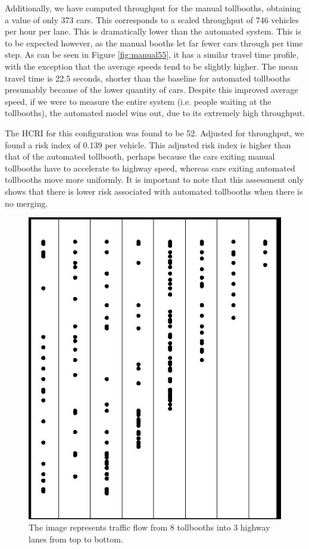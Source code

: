 \documentclass[a4paper, 11pt]{article}
\begin{document}
Additionally, we have computed throughput for the manual tollbooths, obtaining a value of only 373 cars. This corresponds to a scaled throughput of 746 vehicles per hour per lane. This is dramatically lower than the automated system. This is to be expected however, as the manual booths let far fewer cars through per time step. As can be seen in Figure \ref{fig:manual55}, it %
has a similar travel time profile, with the exception that the average speeds tend to be slightly higher. The mean travel time is 22.5 seconds, shorter than the baseline for automated tollbooths presumably because of the lower quantity of cars. Despite this improved average speed, if we were to measure the entire system (i.e. people waiting at the tollbooths), the automated model wins out, due to its extremely high throughput. 

The HCRI for this configuration was found to be 52. Adjusted for throughput, we found a risk index of 0.139 per vehicle. This adjusted risk index is higher than that of the automated tollbooth, perhaps because the cars exiting manual tollbooths have to accelerate to highway speed, whereas cars exiting automated tollbooths move more uniformly.
It is important to note that this assessment only shows that there is lower risk associated with automated tollbooths when there is no merging. 

\begin{figure}[H]
\begin{center}
\includegraphics[scale=0.25]{Images/3By8LeftOne.png}
\end{center}
\caption{The image represents traffic flow from 8 tollbooths into 3 highway lanes from top to bottom. }
\label{fig:3By8RightTri}
\end{figure}
\end{document}
